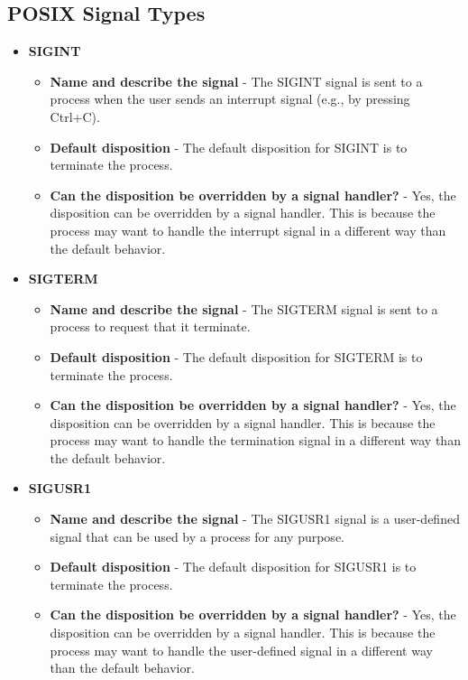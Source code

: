 \documentclass{assignment}
\begin{document}
\subsection{POSIX Signal Types}

\begin{itemize}
    \item \textbf{SIGINT}
    \begin{itemize}
        \item \textbf{Name and describe the signal} - The SIGINT signal is sent to a process when the user sends an interrupt signal (e.g., by pressing Ctrl+C).
        \item \textbf{Default disposition} - The default disposition for SIGINT is to terminate the process.
        \item \textbf{Can the disposition be overridden by a signal handler?} - Yes, the disposition can be overridden by a signal handler. This is because the process may want to handle the interrupt signal in a different way than the default behavior.
    \end{itemize}
    \item \textbf{SIGTERM}
    \begin{itemize}
        \item \textbf{Name and describe the signal} - The SIGTERM signal is sent to a process to request that it terminate.
        \item \textbf{Default disposition} - The default disposition for SIGTERM is to terminate the process.
        \item \textbf{Can the disposition be overridden by a signal handler?} - Yes, the disposition can be overridden by a signal handler. This is because the process may want to handle the termination signal in a different way than the default behavior.
    \end{itemize}
    \item \textbf{SIGUSR1}
    \begin{itemize}
        \item \textbf{Name and describe the signal} - The SIGUSR1 signal is a user-defined signal that can be used by a process for any purpose.
        \item \textbf{Default disposition} - The default disposition for SIGUSR1 is to terminate the process.
        \item \textbf{Can the disposition be overridden by a signal handler?} - Yes, the disposition can be overridden by a signal handler. This is because the process may want to handle the user-defined signal in a different way than the default behavior.

\end{itemize}
\end{itemize}
\end{document}

